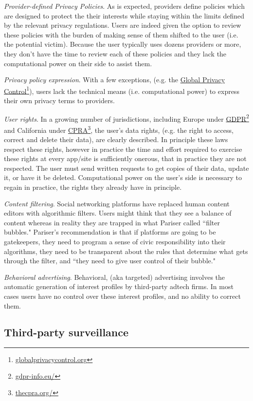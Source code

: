 \documentclass[11pt, oneside]{article}   	%
\newcommand{\hyperfootnote}[1][]{\def\ArgI{{#1}}\hyperfootnoteRelay}
\newcommand\hyperfootnoteRelay[2][]{\href{#1#2}{\ArgI}\footnote{\href{#1#2}{#2}}}
\begin{document}
\emph{Provider-defined Privacy Policies}. As is expected, providers define policies which are designed to protect the their interests while staying within the limits defined by the relevant privacy regulations. Users are indeed given the option to review these policies with the burden of making sense of them shifted to the user (i.e. the potential victim). Because the user typically uses dozens providers or more, they don't have the time to review each of these policies and they lack the computational power on their side to assist them. 

\emph{Privacy policy expression}. With a few exceptions, (e.g. the \hyperfootnote[Global Privacy Control][https://]{globalprivacycontrol.org}), users  lack the technical means (i.e. computational power) to express their own privacy terms to providers. 

\emph{User rights}. In a growing number of jurisdictions, including Europe under \hyperfootnote[GDPR][https://]{gdpr-info.eu/} and California under \hyperfootnote[CPRA][https://]{thecpra.org/}, the user's data rights, (e.g. the right to access, correct and delete their data), are clearly described. In principle these laws respect these rights, however in practice the time and effort required to exercise these rights at every app/site is sufficiently onerous, that in practice they are not respected. The user must send written requests to get copies of their data, update it, or have it be deleted. Computational power on the user's side is necessary to regain in practice, the rights they already have in principle. 

\emph{Content filtering}. Social networking platforms have replaced human content editors with algorithmic filters. Users might think that they see a balance of content whereas in reality they are trapped in what Pariser called ``filter bubbles."\cite{Pariser2011} Pariser's recommendation is that if platforms are going to be gatekeepers, they need to program a sense of civic responsibility into their algorithms, they need to be transparent about the rules that determine what gets through the filter, and ``they need to give user control of their bubble."\cite[p66]{McNamee2020}

\emph{Behavioral advertising}. Behavioral, (aka targeted) advertising involves the automatic generation of interest profiles by third-party adtech firms. In most cases users have no control over these interest profiles, and no ability to correct them.

\subsection{Third-party surveillance}
\end{document}

